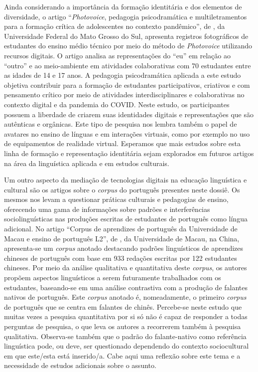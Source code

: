 \documentclass[portuguese]{textolivre}
\begin{document}
Ainda considerando a importância da formação identitária e dos elementos de diversidade,  o artigo “\textit{Photovoice}, pedagogia psicodramática e multiletramentos para a formação crítica de adolescentes no contexto pandêmico”, de \textcite{bomfim_photovoice_2024}, da Universidade Federal do Mato Grosso do Sul, apresenta registros fotográficos de estudantes do ensino médio técnico por meio do método de \textit{Photovoice} utilizando recursos digitais. O artigo analisa as representações do “eu” em relação ao “outro” e ao meio-ambiente em atividades colaborativas com 70 estudantes entre as idades de 14 e 17 anos. A pedagogia psicodramática aplicada a este estudo objetiva contribuir para a formação de estudantes participativos, criativos e com pensamento crítico por meio de atividades interdisciplinares e colaborativas no contexto digital e da pandemia do COVID. Neste estudo, os participantes possuem a liberdade de criarem suas identidades digitais e representações que são autênticas e orgânicas. Este tipo de pesquisa nos lembra também o papel de avatares no ensino de línguas e em interações virtuais, como por exemplo no uso de equipamentos de realidade virtual. Esperamos que mais estudos sobre esta linha de formação e representação identitária sejam explorados em futuros artigos na área da linguística aplicada e em estudos culturais.

Um outro aspecto da mediação de tecnologias digitais na educação linguística e cultural são os artigos sobre o \textit{corpus} do português presentes neste dossiê. Os mesmos nos levam a questionar práticas culturais e pedagogias de ensino, oferecendo uma gama de informações sobre padrões e interferências sociolinguísticas nas produções escritas de estudantes de português como língua adicional. No artigo “Corpus de aprendizes de português da Universidade de Macau e ensino de português L2”, de \textcite{zhang_corpus_2024}, da Universidade de Macau, na China, apresenta-se um \textit{corpus} anotado destacando padrões linguísticos de aprendizes chineses de português com base em 933 redações escritas por 122 estudantes chineses. Por meio da análise qualitativa e quantitativa deste \textit{corpus}, os autores propõem aspectos linguísticos a serem futuramente trabalhados com os estudantes, baseando-se em uma análise contrastiva com a produção de falantes nativos de português. Este \textit{corpus} anotado é, nomeadamente, o primeiro \textit{corpus} de português que se centra em falantes de chinês. Percebe-se neste estudo que muitas vezes a pesquisa quantitativa por si só não é capaz de responder a todas perguntas de pesquisa, o que leva os autores a recorrerem também à pesquisa qualitativa. Observa-se também que o padrão do falante-nativo como referência linguística pode, ou deve, ser questionado dependendo do contexto sociocultural em que este/esta está inserido/a. Cabe aqui uma reflexão sobre este tema e a necessidade de estudos adicionais sobre o assunto.
\end{document}
